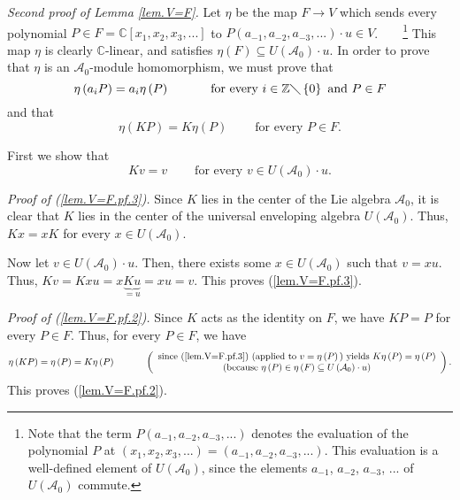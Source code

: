 \documentclass[etingof-lie.tex]{subfiles}
\begin{document}
\textit{Second proof of Lemma \ref{lem.V=F}.} Let $\eta$ be the map
$F\rightarrow V$ which sends every polynomial $P\in F=\mathbb{C}\left[
x_{1},x_{2},x_{3},...\right]  $ to $P\left(  a_{-1},a_{-2},a_{-3},...\right)
\cdot u\in V$.\ \ \ \ \footnote{Note that the term $P\left(  a_{-1}%
,a_{-2},a_{-3},...\right)  $ denotes the evaluation of the polynomial $P$ at
$\left(  x_{1},x_{2},x_{3},...\right)  =\left(  a_{-1},a_{-2},a_{-3}%
,...\right)  $. This evaluation is a well-defined element of $U\left(
\mathcal{A}_{0}\right)  $, since the elements $a_{-1}$, $a_{-2}$, $a_{-3}$,
$...$ of $U\left(  \mathcal{A}_{0}\right)  $ commute.} This map $\eta$ is
clearly $\mathbb{C}$-linear, and satisfies $\eta\left(  F\right)  \subseteq
U\left(  \mathcal{A}_{0}\right)  \cdot u$. In order to prove that $\eta$ is an
$\mathcal{A}_{0}$-module homomorphism, we must prove that
\begin{equation}
\eta\left(  a_{i}P\right)  =a_{i}\eta\left(  P\right)
\ \ \ \ \ \ \ \ \ \ \text{for every }i\in\mathbb{Z}\diagdown\left\{
0\right\}  \text{ and }P\in F \label{lem.V=F.pf.1}%
\end{equation}
and that%
\begin{equation}
\eta\left(  KP\right)  =K\eta\left(  P\right)  \ \ \ \ \ \ \ \ \ \ \text{for
every }P\in F. \label{lem.V=F.pf.2}%
\end{equation}


First we show that%
\begin{equation}
Kv=v\ \ \ \ \ \ \ \ \ \ \text{for every }v\in U\left(  \mathcal{A}_{0}\right)
\cdot u. \label{lem.V=F.pf.3}%
\end{equation}


\textit{Proof of (\ref{lem.V=F.pf.3}).} Since $K$ lies in the center of the
Lie algebra $\mathcal{A}_{0}$, it is clear that $K$ lies in the center of the
universal enveloping algebra $U\left(  \mathcal{A}_{0}\right)  $. Thus,
$Kx=xK$ for every $x\in U\left(  \mathcal{A}_{0}\right)  $.

Now let $v\in U\left(  \mathcal{A}_{0}\right)  \cdot u$. Then, there exists
some $x\in U\left(  \mathcal{A}_{0}\right)  $ such that $v=xu$. Thus,
$Kv=Kxu=x\underbrace{Ku}_{=u}=xu=v$. This proves (\ref{lem.V=F.pf.3}).

\textit{Proof of (\ref{lem.V=F.pf.2}).} Since $K$ acts as the identity on $F$,
we have $KP=P$ for every $P\in F$. Thus, for every $P\in F$, we have%
\[
\eta\left(  KP\right)  =\eta\left(  P\right)  =K\eta\left(  P\right)
\ \ \ \ \ \ \ \ \ \ \left(
\begin{array}
[c]{c}%
\text{since (\ref{lem.V=F.pf.3}) (applied to }v=\eta\left(  P\right)  \text{)
yields }K\eta\left(  P\right)  =\eta\left(  P\right) \\
\text{(because }\eta\left(  P\right)  \in\eta\left(  F\right)  \subseteq
U\left(  \mathcal{A}_{0}\right)  \cdot u\text{)}%
\end{array}
\right)  .
\]
This proves (\ref{lem.V=F.pf.2}).
\end{document}
